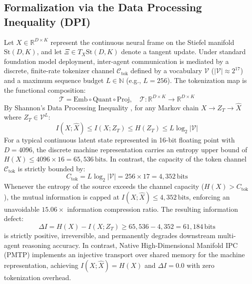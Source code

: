 \documentclass[journal,10pt,compsoc]{IEEEtran}
\theoremstyle{plain}
\theoremstyle{definition}
\begin{document}
\subsection{Formalization via the Data Processing Inequality (DPI)}
Let $X \in \mathbb{R}^{D \times K}$ represent the continuous neural frame on the Stiefel manifold $\mathrm{St}(D, K)$, and let $\Xi \in T_X \mathrm{St}(D, K)$ denote a tangent update. Under standard foundation model deployment, inter-agent communication is mediated by a discrete, finite-rate tokenizer channel $\mathcal{C}_{\text{tok}}$ defined by a vocabulary $\mathcal{V}$ ($|\mathcal{V}| \approx 2^{17}$) and a maximum sequence budget $L \in \mathbb{N}$ (e.g., $L = 256$). The tokenization map is the functional composition:
\begin{equation}
\label{eq:tokenization_map}
\mathcal{T} = \mathrm{Emb} \circ \mathrm{Quant} \circ \mathrm{Proj}, \quad \mathcal{T}: \mathbb{R}^{D \times K} \to \mathbb{R}^{D \times K}
\end{equation}
By Shannon's Data Processing Inequality \cite{shannon1948mathematical, cover2006elements}, for any Markov chain $X \to Z_T \to \hat{X}$ where $Z_T \in \mathcal{V}^L$:
\begin{equation}
\label{eq:dpi_bound}
I(X; \hat{X}) \le I(X; Z_T) \le H(Z_T) \le L \log_2 |\mathcal{V}|
\end{equation}
For a typical continuous latent state represented in 16-bit floating point with $D = 4096$, the discrete machine representation carries an entropy upper bound of $H(X) \le 4096 \times 16 = 65{,}536\,\text{bits}$. In contrast, the capacity of the token channel $\mathcal{C}_{\text{tok}}$ is strictly bounded by:
\begin{equation}
\label{eq:channel_capacity}
C_{\text{tok}} = L \log_2 |\mathcal{V}| = 256 \times 17 = 4{,}352\,\text{bits}
\end{equation}
Whenever the entropy of the source exceeds the channel capacity ($H(X) > C_{\text{tok}}$), the mutual information is capped at $I(X; \hat{X}) \le 4{,}352\,\text{bits}$, enforcing an unavoidable $15.06\times$ information compression ratio. The resulting information defect:
\begin{equation}
\label{eq:defect}
\Delta I = H(X) - I(X; Z_T) \ge 65{,}536 - 4{,}352 = 61{,}184\,\text{bits}
\end{equation}
is strictly positive, irreversible, and permanently degrades downstream multi-agent reasoning accuracy. In contrast, Native High-Dimensional Manifold IPC (PMTP) implements an injective transport over shared memory for the machine representation, achieving $I(X; \hat{X}) = H(X)$ and $\Delta I = 0.0$ with zero tokenization overhead.
\end{document}
